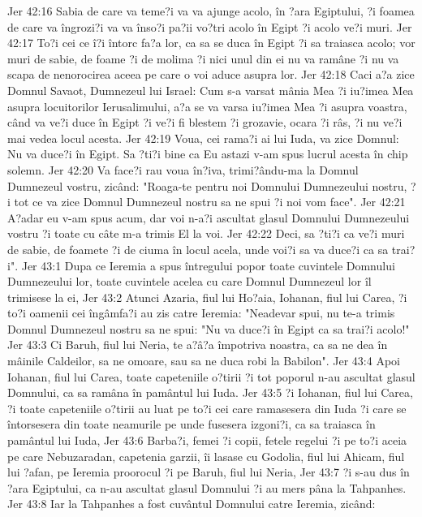 Jer 42:16  Sabia de care va teme?i va va ajunge acolo, în ?ara Egiptului, ?i foamea de care va îngrozi?i va va înso?i pa?ii vo?tri acolo în Egipt ?i acolo ve?i muri.
Jer 42:17  To?i cei ce î?i întorc fa?a lor, ca sa se duca în Egipt ?i sa traiasca acolo; vor muri de sabie, de foame ?i de molima ?i nici unul din ei nu va ramâne ?i nu va scapa de nenorocirea aceea pe care o voi aduce asupra lor.
Jer 42:18  Caci a?a zice Domnul Savaot, Dumnezeul lui Israel: Cum s-a varsat mânia Mea ?i iu?imea Mea asupra locuitorilor Ierusalimului, a?a se va varsa iu?imea Mea ?i asupra voastra, când va ve?i duce în Egipt ?i ve?i fi blestem ?i grozavie, ocara ?i râs, ?i nu ve?i mai vedea locul acesta.
Jer 42:19  Voua, cei rama?i ai lui Iuda, va zice Domnul: Nu va duce?i în Egipt. Sa ?ti?i bine ca Eu astazi v-am spus lucrul acesta în chip solemn.
Jer 42:20  Va face?i rau voua în?iva, trimi?ându-ma la Domnul Dumnezeul vostru, zicând: "Roaga-te pentru noi Domnului Dumnezeului nostru, ?i tot ce va zice Domnul Dumnezeul nostru sa ne spui ?i noi vom face".
Jer 42:21  A?adar eu v-am spus acum, dar voi n-a?i ascultat glasul Domnului Dumnezeului vostru ?i toate cu câte m-a trimis El la voi.
Jer 42:22  Deci, sa ?ti?i ca ve?i muri de sabie, de foamete ?i de ciuma în locul acela, unde voi?i sa va duce?i ca sa trai?i".
Jer 43:1  Dupa ce Ieremia a spus întregului popor toate cuvintele Domnului Dumnezeului lor, toate cuvintele acelea cu care Domnul Dumnezeul lor îl trimisese la ei,
Jer 43:2  Atunci Azaria, fiul lui Ho?aia, Iohanan, fiul lui Carea, ?i to?i oamenii cei îngâmfa?i au zis catre Ieremia: "Neadevar spui, nu te-a trimis Domnul Dumnezeul nostru sa ne spui: "Nu va duce?i în Egipt ca sa trai?i acolo!"
Jer 43:3  Ci Baruh, fiul lui Neria, te a?â?a împotriva noastra, ca sa ne dea în mâinile Caldeilor, sa ne omoare, sau sa ne duca robi la Babilon".
Jer 43:4  Apoi Iohanan, fiul lui Carea, toate capeteniile o?tirii ?i tot poporul n-au ascultat glasul Domnului, ca sa ramâna în pamântul lui Iuda.
Jer 43:5  ?i Iohanan, fiul lui Carea, ?i toate capeteniile o?tirii au luat pe to?i cei care ramasesera din Iuda ?i care se întorsesera din toate neamurile pe unde fusesera izgoni?i, ca sa traiasca în pamântul lui Iuda,
Jer 43:6  Barba?i, femei ?i copii, fetele regelui ?i pe to?i aceia pe care Nebuzaradan, capetenia garzii, îi lasase cu Godolia, fiul lui Ahicam, fiul lui ?afan, pe Ieremia proorocul ?i pe Baruh, fiul lui Neria,
Jer 43:7  ?i s-au dus în ?ara Egiptului, ca n-au ascultat glasul Domnului ?i au mers pâna la Tahpanhes.
Jer 43:8  Iar la Tahpanhes a fost cuvântul Domnului catre Ieremia, zicând:
